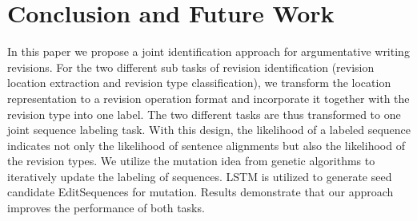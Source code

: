 \documentclass[11pt]{article}
\begin{document}




\section{Conclusion and Future Work}
In this paper we propose a joint identification approach for argumentative writing revisions. For the two different sub tasks of revision identification (revision location extraction and revision type classification), we transform the location representation to a revision operation format and incorporate it together with the revision type into one label. The two different tasks are thus transformed to one joint sequence labeling task. With this design, the likelihood of a labeled sequence indicates not only the likelihood of sentence alignments but also the likelihood of the revision types. We utilize the mutation idea from genetic algorithms to iteratively update the labeling of sequences. LSTM is utilized to generate seed candidate EditSequences for mutation. Results demonstrate that our approach improves the performance of both tasks.
\end{document}
